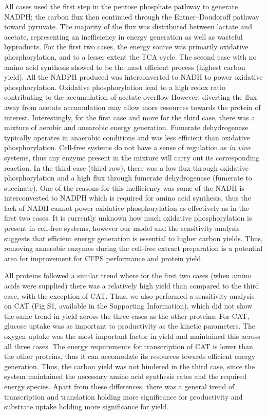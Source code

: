 \documentclass[journal=asbcd6,manuscript=article]{achemso}
\begin{document}
All cases used the first step in the pentose phosphate pathway to generate NADPH;
the carbon flux then continued through the Entner–Doudoroff pathway toward pyruvate.
The majority of the flux was distributed between lactate and acetate, representing an inefficiency in energy generation as well as wasteful byproducts.
For the first two cases, the energy source was primarily oxidative phosphorylation, and to a lesser extent the TCA cycle.
The second case with no amino acid synthesis showed to be the most efficient process (highest carbon yield).
All the NADPH produced was interconverted to NADH to power oxidative phosphorylation.
Oxidative phosphorylation lead to a high redox ratio contributing to the accumulation of acetate overflow
However, diverting the flux away from acetate accumulation may allow more resources towards the protein of interest.
Interestingly, for the first case and more for the third case, there was a mixture of aerobic and anearobic energy generation.
Fumerate dehydrogenase typically operates in anaerobic conditions and was less efficient than oxidative phosphorylation.
Cell-free systems do not have a sense of regulation as \textit{in vivo} systems, thus any enzyme present in the mixture will carry out its corresponding reaction.
In the third case (third row), there was a low flux through oxidative phosphorylation and a high flux through fumerate dehydrogenase (fumerate to succinate).
One of the reasons for this inefficiency was some of the NADH is interconverted to NADPH which is required for amino acid synthesis, thus the lack of NADH cannot power oxidative phosphorylation as effectively as in the first two cases.
It is currently unknown how much oxidative phosphorylation is present in cell-free systems, however our model and the sensitivity analysis suggests that efficient energy generation is essential to higher carbon yields.
Thus, removing anaerobic enzymes during the cell-free extract preparation is a potential area for improvement for CFPS performance and protein yield.

All proteins followed a similar trend where for the first two cases (when amino acids were supplied) there was a relatively high yield than compared to the third case, with the exception of CAT.
Thus, we also performed a sensitivity analysis on CAT (Fig S1, available in the Supporting Information), which did not show the same trend in yield across the three cases as the other proteins.
For CAT, glucose uptake was as important to productivity as the kinetic parameters.
The oxygen uptake was the most important factor in yield and maintained this across all three cases.
The energy requirements for transcription of CAT is lower than the other proteins, thus it can accomodate its resources towards efficient energy generation.
Thus, the carbon yield was not hindered in the third case, since the system maintained the necessary amino acid synthesis rates and the required energy species.
Apart from these differences, there was a general trend of transcription and translation holding more significance for productivity and substrate uptake holding more significance for yield.
\end{document}
